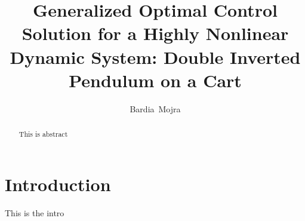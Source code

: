 \documentclass[journal]{IEEEtran}
\begin{document}
%
\title{Generalized Optimal Control Solution for a Highly
Nonlinear Dynamic System: Double Inverted Pendulum on a Cart}
\author{Bardia~Mojra}
\maketitle

\begin{abstract}
This is abstract
\end{abstract}



\section{Introduction}
This is the intro\\
\end{document}

